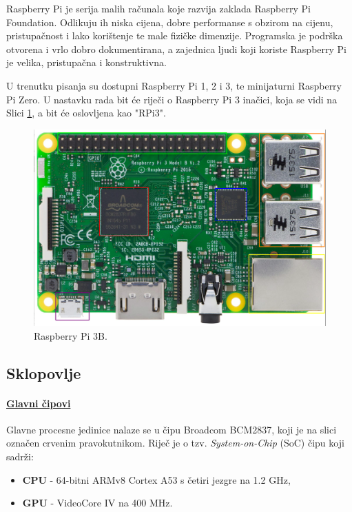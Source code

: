 \documentclass[12pt,a4paper]{article}
\begin{document}
Raspberry Pi je serija malih računala koje razvija zaklada Raspberry Pi Foundation. Odlikuju ih niska cijena, dobre performanse s obzirom na cijenu, pristupačnost i lako korištenje te male fizičke dimenzije. Programska je podrška otvorena i vrlo dobro dokumentirana, a zajednica ljudi koji koriste Raspberry Pi je velika, pristupačna i konstruktivna. \\
\par
U trenutku pisanja su dostupni Raspberry Pi 1, 2 i 3, te minijaturni Raspberry Pi Zero. U nastavku rada bit će riječi o Raspberry Pi 3 inačici, koja se vidi na Slici \ref{fig:rpi3}, a bit će oslovljena kao "RPi3".
\begin{figure}[h!]
  \includegraphics[width=\linewidth]{slike/rpi3_color.png}
  \caption{Raspberry Pi 3B.}
  \label{fig:rpi3}
\end{figure}

	\subsection{Sklopovlje}
		\paragraph{\underline{Glavni čipovi}} %
		\label{par:main_chips}
		
		Glavne procesne jedinice nalaze se u čipu Broadcom BCM2837, koji je na slici označen crvenim pravokutnikom. Riječ je o tzv. \textit{System-on-Chip} (SoC) čipu koji sadrži:
		\begin{itemize}
			\item \textbf{CPU} - 64-bitni ARMv8 Cortex A53 s četiri jezgre na 1.2 GHz,
			\item \textbf{GPU} - VideoCore IV na 400 MHz.
		\end{itemize}
\end{document}
